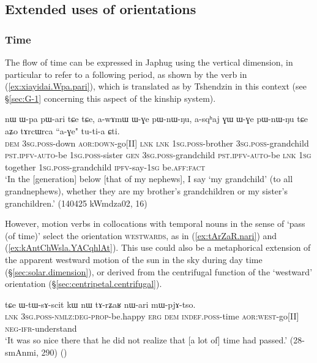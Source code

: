 \subsection{Extended uses of orientations} \label{sec:orientation.extended}

\subsubsection{Time} \label{sec:vertical.preverbs.time}
The flow of time can be expressed in Japhug using the vertical dimension, in particular to refer to a following period, as shown by the verb   in (\ref{ex:xiayidai.Wpa.pari}), which is translated as  by Tshendzin in this context (see §\ref{sec:G-1} concerning this aspect of the kinship system).

\begin{exe}
\ex \label{ex:xiayidai.Wpa.pari}
\gll nɯ ɯ-pa pɯ-ari tɕe tɕe, a-wɤmɯ ɯ-ɣe pɯ-nɯ-ŋu, a-sqʰaj ɣɯ ɯ-ɣe pɯ-nɯ-ŋu tɕe aʑo tɤrcɯrca ``a-ɣe" tu-ti-a ɕti. \\
\textsc{dem} \textsc{3sg}.\textsc{poss}-down \textsc{aor}:\textsc{down}-go[II] \textsc{lnk} \textsc{lnk} \textsc{1sg}.\textsc{poss}-brother \textsc{3sg}.\textsc{poss}-grandchild \textsc{pst}.\textsc{ipfv}-\textsc{auto}-be \textsc{1sg}.\textsc{poss}-sister \textsc{gen} \textsc{3sg}.\textsc{poss}-grandchild \textsc{pst}.\textsc{ipfv}-\textsc{auto}-be \textsc{lnk} \textsc{1sg} together \textsc{1sg}.\textsc{poss}-grandchild \textsc{ipfv}-say-\textsc{1sg} be.\textsc{aff}:\textsc{fact} \\
\glt `In the [generation] below [that of my nephews], I say  `my grandchild' (to all grandnephews), whether they are my brother's grandchildren or my sister's granchildren.' (140425 kWmdza02, 16)
\end{exe}

However, motion verbs in collocations with temporal nouns in the sense of `pass (of time)' select the orientation \textsc{westwards}, as in (\ref{ex:tArZaR.nari}) and (\ref{ex:kAntChWsla.YACqhlAt}). This use could also be a metaphorical extension of the apparent westward motion of the sun in the sky during day time  (§\ref{sec:solar.dimension}), or derived from the centrifugal function of the `westward' orientation 
(§\ref{sec:centripetal.centrifugal}).

\begin{exe}
\ex \label{ex:tArZaR.nari}
\gll   tɕe ɯ-tɯ-sɤ-scit kɯ nɯ tɤ-rʑaʁ nɯ-ari mɯ-pjɤ-tso. \\
\textsc{lnk} \textsc{3sg}.\textsc{poss}-\textsc{nmlz}:\textsc{deg}-\textsc{prop}-be.happy \textsc{erg} \textsc{dem} \textsc{indef}.\textsc{poss}-time \textsc{aor}:\textsc{west}-go[II] \textsc{neg}-\textsc{ifr}-understand \\
\glt  `It was so nice there that he did not realize that [a lot of] time had passed.' (28-smAnmi, 290) ()
\end{exe}

